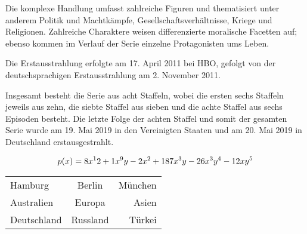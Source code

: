 \documentclass{article}
\begin{document}
Die komplexe Handlung umfasst zahlreiche Figuren und thematisiert unter anderem Politik und Machtkämpfe, Gesellschaftsverhältnisse, Kriege und Religionen. Zahlreiche Charaktere weisen differenzierte moralische Facetten auf; ebenso kommen im Verlauf der Serie einzelne Protagonisten ums Leben.  
  
Die Erstausstrahlung erfolgte am 17. April 2011 bei HBO, gefolgt von der deutschsprachigen Erstausstrahlung am 2. November 2011.  
  
Insgesamt besteht die Serie aus acht Staffeln, wobei die ersten sechs Staffeln jeweils aus zehn, die siebte Staffel aus sieben und die achte Staffel aus sechs Episoden besteht. Die letzte Folge der achten Staffel und somit der gesamten Serie wurde am 19. Mai 2019 in den Vereinigten Staaten und am 20. Mai 2019 in Deutschland erstausgestrahlt.  
  
  
\newpage  
\begin{equation}  
p(x) = 8x^12 + 1x^9y - 2x^2 + 187x^3y\\   
- 26x^3y^4 - 12xy^5   
\end{equation}   
  
\begin{center}  
\begin{tabular}{ l | c | r }  
  \hline			  
   Hamburg & Berlin & München \\  
  Australien & Europa & Asien \\  
  Deutschland & Russland & Türkei \\  
  \hline    
\end{tabular}  
\end{center}  
  
  
\end{document}
